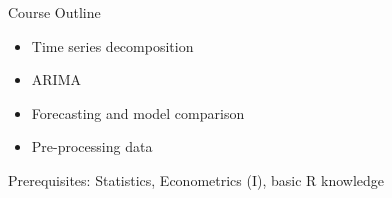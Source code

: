 \begin{frame} %
	
	
\end{frame}




\begin{frame}{Course Outline}
	

	
	\begin{itemize}[<+->]
		\item Time series decomposition
		\item ARIMA
		\item Forecasting and model comparison
		\item Pre-processing data 
	\end{itemize}
	
	\pause

	Prerequisites: Statistics, Econometrics (I), basic R knowledge
	
\end{frame}


